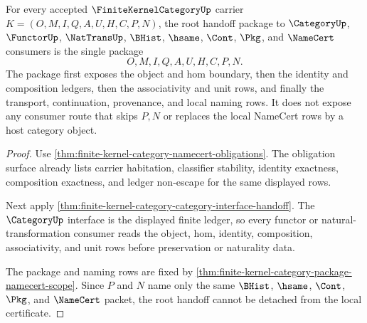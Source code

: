 \begin{theorem}
\label{thm:finite-kernel-category-root-handoff-package}
For every accepted $\FiniteKernelCategoryUp$ carrier $K=(O,M,I,Q,A,U,H,C,P,N)$, the root handoff package to $\CategoryUp$, $\FunctorUp$, $\NatTransUp$, $\BHist$, $\hsame$, $\Cont$, $\Pkg$, and $\NameCert$ consumers is the single package
$$
O,M,I,Q,A,U,H,C,P,N.
$$
The package first exposes the object and hom boundary, then the identity and composition ledgers, then the associativity and unit rows, and finally the transport, continuation, provenance, and local naming rows. It does not expose any consumer route that skips $P,N$ or replaces the local NameCert rows by a host category object.
\end{theorem}
\begin{proof}
Use \autoref{thm:finite-kernel-category-namecert-obligations}. The obligation surface already lists carrier habitation, classifier stability, identity exactness, composition exactness, and ledger non-escape for the same displayed rows.

Next apply \autoref{thm:finite-kernel-category-category-interface-handoff}. The $\CategoryUp$ interface is the displayed finite ledger, so every functor or natural-transformation consumer reads the object, hom, identity, composition, associativity, and unit rows before preservation or naturality data.

The package and naming rows are fixed by \autoref{thm:finite-kernel-category-package-namecert-scope}. Since $P$ and $N$ name only the same $\BHist$, $\hsame$, $\Cont$, $\Pkg$, and $\NameCert$ packet, the root handoff cannot be detached from the local certificate.
\end{proof}

